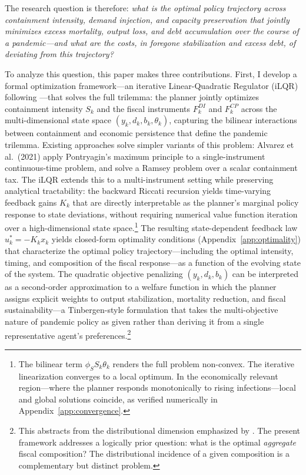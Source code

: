 \documentclass[12pt, a4paper]{article}
\begin{document}
The research question is therefore: \textit{what is the optimal policy trajectory
across containment intensity, demand injection, and capacity preservation that jointly
minimizes excess mortality, output loss, and debt accumulation over the course of a
pandemic---and what are the costs, in foregone stabilization and excess debt, of
deviating from this trajectory?}


To analyze this question, this paper makes three contributions. First, I develop a formal optimization framework---an iterative Linear-Quadratic
Regulator (iLQR) following \citet{bertsekas2017dynamic}---that solves the full trilemma: the
planner jointly optimizes containment intensity $S_k$ and the fiscal instruments
$F_k^{DI}$ and $F_k^{CP}$ across the multi-dimensional state space
$(y_k, d_k, b_k, \theta_k)$, capturing the bilinear interactions between containment
and economic persistence that define the pandemic trilemma. Existing approaches solve
simpler variants of this problem: Alvarez et al.\ (2021) apply Pontryagin's maximum
principle to a single-instrument continuous-time problem, and \citet{eichenbaum2021macro} solve a Ramsey problem over a scalar containment tax. The iLQR extends this to a multi-instrument setting while preserving analytical tractability: the backward Riccati recursion yields time-varying feedback gains $K_k$ that are directly interpretable as the planner's marginal policy response to state deviations, without requiring numerical value function iteration over a high-dimensional state space.\footnote{The bilinear term $\phi_S S_k \theta_k$ renders the full problem non-convex. The iterative linearization converges to a local optimum. In the
economically relevant region---where the planner responds monotonically to rising infections---local and global solutions coincide, as verified numerically in Appendix~\ref{app:convergence}.} The resulting state-dependent feedback law $u_k^* = -K_k x_k$ yields closed-form optimality conditions (Appendix~\ref{app:optimality}) that characterize the optimal policy trajectory---including the optimal intensity, timing, and composition of the fiscal response---as a function of the evolving state of the system. The quadratic objective penalizing $(y_k, d_k, b_k)$ can be interpreted as a second-order approximation to a welfare function in which the planner assigns explicit weights to output stabilization, mortality reduction, and fiscal sustainability---a Tinbergen-style formulation that takes the multi-objective nature of pandemic policy as given rather than deriving it from a single representative agent's preferences.\footnote{This abstracts from the distributional dimension emphasized by \citet{KaplanMollViolante2020}. The present framework addresses a logically prior question: what is the optimal \textit{aggregate} fiscal composition? The distributional incidence of a given composition is a complementary but distinct problem.}
\end{document}
